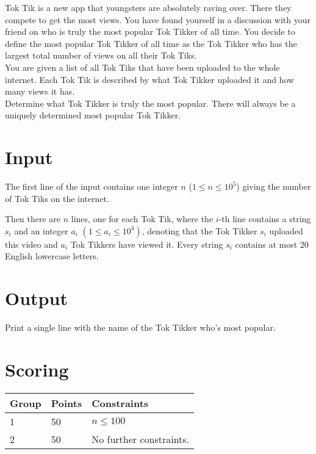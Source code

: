 
Tok Tik is a new app that youngsters are absolutely raving over. There they compete
to get the most views. You have found yourself in a discussion with your friend
on who is truly the most popular Tok Tikker of all time. You decide to define
the most popular Tok Tikker of all time as the Tok Tikker who has the largest
total number of views on all their Tok Tiks. \\

You are given a list of all Tok Tiks that have been uploaded to the whole internet.
Each Tok Tik is described by what Tok Tikker uploaded it and how many views it has. \\

Determine what Tok Tikker is truly the most popular. There will always be a uniquely
determined most popular Tok Tikker.

\section*{Input}
The first line of the input contains one integer $n$ ($1 \leq n \leq 10^5$)
giving the number of Tok Tiks on the internet.

Then there are $n$ lines, one for each Tok Tik, where the $i$-th line contains
a string $s_i$ and an integer $a_i$ $(1 \leq a_i \leq 10^4)$, denoting that the
Tok Tikker $s_i$ uploaded this video and $a_i$ Tok Tikkers have viewed it.
Every string $s_i$ contains at most $20$ English lowercase letters.

\section*{Output}
Print a single line with the name of the Tok Tikker who's most popular.

\section*{Scoring}
\begin{tabular}{|l|l|l|}
\hline
Group & Points & Constraints \\ \hline
1     & 50   & $n \leq 100$ \\ \hline
2     & 50   & No further constraints. \\ \hline
\end{tabular}

